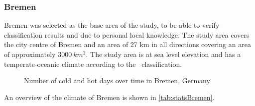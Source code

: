 \documentclass[12pt,a4paper, english,twoside]{article}
\begin{document}
    \subsubsection{Bremen}
      Bremen was selected as the base area of the study, to be able to verify classification results and due to personal local knowledge. 
      The study area covers the city centre of Bremen and an area of 27 km in all directions covering an area of approximately $3000\ km^2$. 
      The study area is at sea level elevation and has a temperate-oceanic climate according to the~\autocite{koppen1930handbuch} classification.%
      \begin{figure}[!htbp]
        \begin{subfigure}[b]{\textwidth}
          
        \end{subfigure}
        \begin{subfigure}[b]{\textwidth}
           
        \end{subfigure}
        \caption{Number of cold and hot days over time in Bremen, Germany\label{fig:breTempExtr}}
      \end{figure}
      An overview of the climate of Bremen is shown in \cref{tab:statsBremen}.
\end{document}
